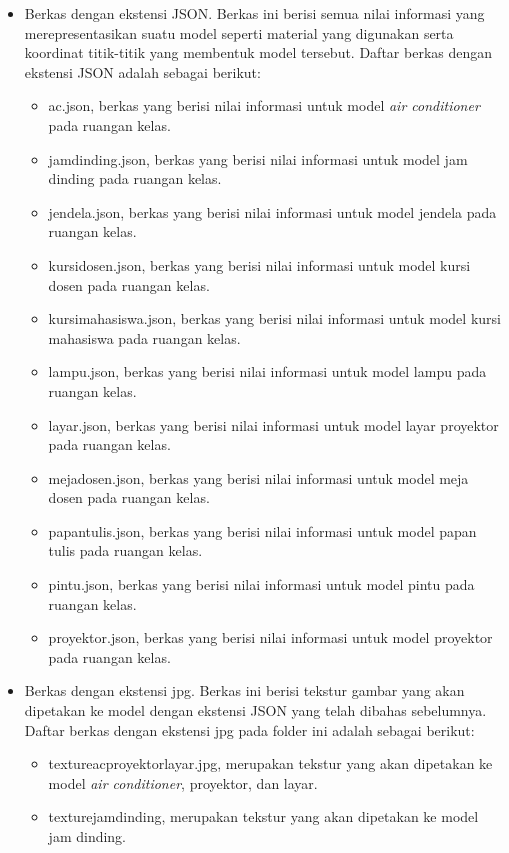 \begin{itemize}
\begin{itemize}
		\item Berkas dengan ekstensi JSON. Berkas ini berisi semua nilai informasi yang merepresentasikan suatu model seperti material yang digunakan serta koordinat titik-titik yang membentuk model tersebut. Daftar berkas dengan ekstensi JSON adalah sebagai berikut:
		\begin{itemize}
			\item ac.json, berkas yang berisi nilai informasi untuk model {\it air conditioner} pada ruangan kelas.
			\item jamdinding.json, berkas yang berisi nilai informasi untuk model jam dinding pada ruangan kelas.
			\item jendela.json, berkas yang berisi nilai informasi untuk model jendela pada ruangan kelas.
			\item kursidosen.json, berkas yang berisi nilai informasi untuk model kursi dosen pada ruangan kelas.
			\item kursimahasiswa.json, berkas yang berisi nilai informasi untuk model kursi mahasiswa pada ruangan kelas.
			\item lampu.json, berkas yang berisi nilai informasi untuk model lampu pada ruangan kelas.
			\item layar.json, berkas yang berisi nilai informasi untuk model layar proyektor pada ruangan kelas.
			\item mejadosen.json, berkas yang berisi nilai informasi untuk model meja dosen pada ruangan kelas.
			\item papantulis.json, berkas yang berisi nilai informasi untuk model papan tulis pada ruangan kelas.
			\item pintu.json, berkas yang berisi nilai informasi untuk model pintu pada ruangan kelas.
			\item proyektor.json, berkas yang berisi nilai informasi untuk model proyektor pada ruangan kelas.
		\end{itemize}
		\item Berkas dengan ekstensi jpg. Berkas ini berisi tekstur gambar yang akan dipetakan ke model dengan ekstensi JSON yang telah dibahas sebelumnya. Daftar berkas dengan ekstensi jpg pada folder ini adalah sebagai berikut:
		\begin{itemize}
			\item textureacproyektorlayar.jpg, merupakan tekstur yang akan dipetakan ke model {\it air conditioner}, proyektor, dan layar.
			\item texturejamdinding, merupakan tekstur yang akan dipetakan ke model jam dinding.

\end{itemize}
\end{itemize}
\end{itemize}
